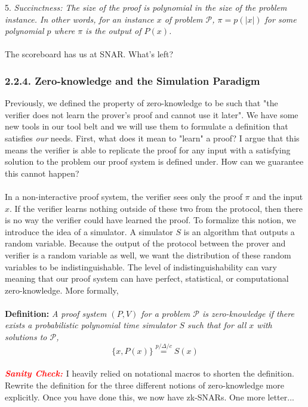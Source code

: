 \documentclass{article}
\newcommand{\scheck}{\textbf{\textit{\textcolor{red}{Sanity Check: }}}}
\begin{document}
5. \textit{Succinctness: The size of the proof is polynomial in the size of the problem instance. In other words, for an instance $x$ of problem $\mathcal{P}$, $\pi = p(\lvert x \rvert)$ for some polynomial $p$ where $\pi$ is the output of $P(x)$.} \\ \\
\noindent The scoreboard has us at SNAR. What's left?

\subsubsection*{2.2.4. Zero-knowledge and the Simulation Paradigm}
Previously, we defined the property of zero-knowledge to be such that "the verifier does not learn the prover's proof and cannot use it later". We have some new tools in our tool belt and we will use them to formulate a definition that satisfies \textit{our} needs. First, what does it mean to "learn" a proof? I argue that this means the verifier is able to replicate the proof for any input with a satisfying solution to the problem our proof system is defined under. How can we guarantee this cannot happen? \\ \\
\noindent In a non-interactive proof system, the verifier sees only the proof $\pi$ and the input $x$. If the verifier learns nothing outside of these two from the protocol, then there is no way the verifier could have learned the proof. To formalize this notion, we introduce the idea of a simulator. A simulator $S$ is an algorithm that outputs a random variable. Because the output of the protocol between the prover and verifier is a random variable as well, we want the distribution of these random variables to be indistinguishable. The level of indistinguishability can vary meaning that our proof system can have perfect, statistical, or computational zero-knowledge. More formally, \\ \\
\noindent \textbf{Definition: } \textit{A proof system $(P, V)$ for a problem $\mathcal{P}$ is zero-knowledge if there exists a probabilistic polynomial time simulator $S$ such that for all $x$ with solutions to $\mathcal{P}$,}
$$\{x, P(x)\} \stackrel{p/\Delta/c}{=} S(x)$$
\\
\noindent \scheck I heavily relied on notational macros to shorten the definition. Rewrite the definition for the three different notions of zero-knowledge more explicitly. Once you have done this, we now have zk-SNARs. One more letter...
\end{document}
